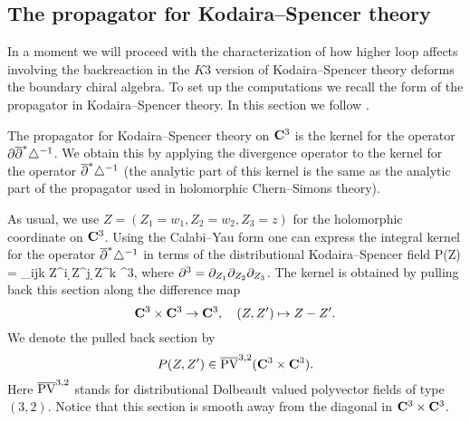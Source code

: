 \documentclass[../main.tex]{subfiles}
\begin{document}
\subsection{The propagator for Kodaira--Spencer theory}

In a moment we will proceed with the characterization of how higher loop affects involving the backreaction in the $K3$ version of Kodaira--Spencer theory deforms the boundary chiral algebra.
To set up the computations we recall the form of the propagator in Kodaira--Spencer theory.
In this section we follow \cite{CLbcov1}.

The propagator for Kodaira--Spencer theory on $\mathbf{C}^3$ is the kernel for the operator $\partial \overline{\partial}^* \triangle^{-1}$. 
We obtain this by applying the divergence operator to the kernel for the operator $\overline{\partial}^* \triangle^{-1}$ (the analytic part of this kernel is the same as the analytic part of the propagator used in holomorphic Chern--Simons theory). 

As usual, we use $Z = (Z_1 = w_1, Z_2=w_2,Z_3=z)$ for the holomorphic coordinate on $\mathbf{C}^3$.
Using the Calabi--Yau form one can express the integral kernel for the operator $\overline{\partial}^* \triangle^{-1}$ in terms of the distributional Kodaira--Spencer field
\beqn
P(Z) =  \ep_{ijk} \br Z^{i} \d \br Z^j \d \br Z^k \del^3,
\eeqn
where $\partial^3 = \partial_{Z_1} \partial_{Z_2} \partial_{Z_3}$.
The kernel is obtained by pulling back this section along the difference map 
\[
\mathbf{C}^3 \times \mathbf{C}^3 \to \mathbf{C}^3,\quad (Z,Z') \mapsto Z - Z' .
\]
We denote the pulled back section by
\[
P(Z,Z') \in \overline{{\rm PV}}^{3,2}(\mathbf{C}^3 \times \mathbf{C}^3) . 
\]
Here $\overline{{\rm PV}}^{3,2}$ stands for distributional Dolbeault valued polyvector fields of type $(3,2)$.
Notice that this section is smooth away from the diagonal in $\mathbf{C}^3 \times \mathbf{C}^3$. 
\end{document}
